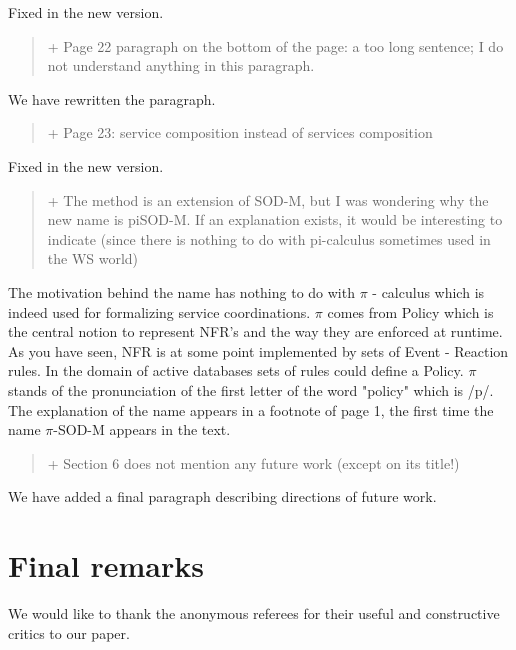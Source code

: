 \documentclass[12pt,a4wide]{article}
\begin{document}
\noindent 
Fixed in the new version.

\begin{quotation}\sf\footnotesize

+ Page 22 paragraph on the bottom of the page: a too long sentence; I do not understand anything in this paragraph. 
\end{quotation}

\noindent 
We have rewritten the paragraph.

\begin{quotation}\sf\footnotesize

+ Page 23: service composition instead of services composition 
\end{quotation}

\noindent 
Fixed in the new version.


\begin{quotation}\sf\footnotesize

+ The method is an extension of SOD-M, but I was wondering why the new name is piSOD-M. If an explanation exists, it would be interesting to indicate (since there is nothing to do with pi-calculus sometimes used in the WS world) 
\end{quotation}

\noindent 
The motivation behind the name has nothing to do with $\pi$ - calculus which is indeed used for formalizing service coordinations. $\pi$ comes from Policy which is the central notion to represent  NFR's and the way they are enforced at runtime. As you have seen, NFR is at some point implemented by sets of Event - Reaction rules. In the domain of active databases sets of rules could define a Policy. $\pi$ stands of the pronunciation of the first letter of the word "policy" which is /p/. The explanation of the name appears in a footnote of page 1, the first time the name $\pi$-SOD-M appears in the text. 


\begin{quotation}\sf\footnotesize

+ Section 6 does not mention any future work (except on its title!) 

\end{quotation}

\noindent 
We have added a final paragraph describing directions of future work.



\section*{Final remarks}

We would like to thank the anonymous referees for their useful and constructive critics to our paper.


  
\end{document}
